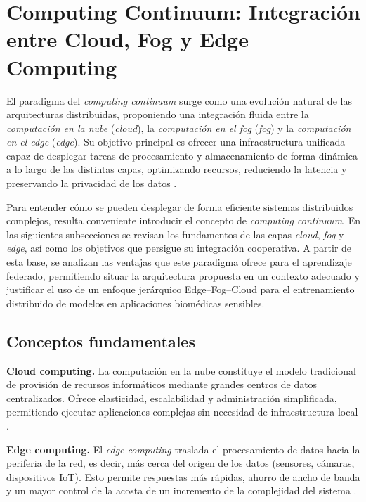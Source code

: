 \documentclass{report}
\begin{document}
\section{Computing Continuum: Integración entre Cloud, Fog y Edge Computing}
\label{sec:continuum}

El paradigma del \textit{computing continuum} surge como una evolución natural de las arquitecturas distribuidas, proponiendo una integración fluida entre la \textit{computación en la nube} (\textit{cloud}), la \textit{computación en el fog} (\textit{fog}) y la \textit{computación en el edge} (\textit{edge}). Su objetivo principal es ofrecer una infraestructura unificada capaz de desplegar tareas de procesamiento y almacenamiento de forma dinámica a lo largo de las distintas capas, optimizando recursos, reduciendo la latencia y preservando la privacidad de los datos \cite{gkonis2023survey,bittencourt2025continuum,moreschini2022cloudcontinuum}.

Para entender cómo se pueden desplegar de forma eficiente sistemas distribuidos complejos, resulta conveniente introducir el concepto de \textit{computing continuum}. En las siguientes subsecciones se revisan los fundamentos de las capas \textit{cloud}, \textit{fog} y \textit{edge}, así como los objetivos que persigue su integración cooperativa. A partir de esta base, se analizan las ventajas que este paradigma ofrece para el aprendizaje federado, permitiendo situar la arquitectura propuesta en un contexto adecuado y justificar el uso de un enfoque jerárquico Edge–Fog–Cloud para el entrenamiento distribuido de modelos en aplicaciones biomédicas sensibles.

\subsection{Conceptos fundamentales}

\textbf{Cloud computing.}  
La computación en la nube constituye el modelo tradicional de provisión de recursos informáticos mediante grandes centros de datos centralizados. Ofrece elasticidad, escalabilidad y administración simplificada, permitiendo ejecutar aplicaciones complejas sin necesidad de infraestructura local \cite{mouradian2017comprehensive,naha2018fog}.

\textbf{Edge computing.}  
El \textit{edge computing} traslada el procesamiento de datos hacia la periferia de la red, es decir, más cerca del origen de los datos (sensores, cámaras, dispositivos IoT). Esto permite respuestas más rápidas, ahorro de ancho de banda y un mayor control de la acosta de un incremento de la complejidad del sistema \cite{varshney2017characterizing}.  
\end{document}
